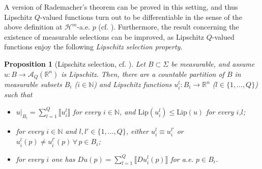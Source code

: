 \documentclass[a4paper,11pt,reqno]{amsart}
\newtheorem{proposition}[theorem]{Proposition}
\theoremstyle{definition}
\numberwithin{equation}{section}
\numberwithin{subsection}{section}
\newcommand{\N}{\mathbb{N}}
\newcommand{\R}{\mathbb{R}}
\newcommand{\A}{\mathcal{A}}
\newcommand{\Lip}{\mathrm{Lip}}
\newcommand{\spt}{\mathrm{spt}}
\newcommand{\Ha}{\mathcal{H}}
\begin{document}
A version of Rademacher's theorem can be proved in this setting, and thus Lipschitz $Q$-valued functions turn out to be differentiable in the sense of the above definition at $\Ha^{m}$-a.e. $p$ (cf. \cite[Theorem 1.13]{DLS11a}). Furthermore, the result concerning the existence of measurable selections can be improved, as Lipschitz $Q$-valued functions enjoy the following \emph{Lipschitz selection property}.
\begin{proposition}[Lipschitz selection, cf. {\cite[Lemma 1.1]{DLS13a}}] \label{Lip_sel}
Let $B \subset \Sigma$ be measurable, and assume $u \colon B \to \A_{Q}(\R^n)$ is Lipschitz. Then, there are a countable partition of $B$ in measurable subsets $B_{i}$ ($i \in \N$) and Lipschitz functions $u_{i}^{l} \colon B_{i} \to \R^n$ ($l \in \{1,\dots,Q\}$) such that
\begin{itemize}
\item[$(a)$] $u|_{B_i} = \sum_{l=1}^{Q} \llbracket u_{i}^{l} \rrbracket$ for every $i \in \N$, and $\Lip(u_{i}^{l}) \leq \Lip(u)$ for every $i$,$l$;
\item[$(b)$] for every $i \in \N$ and $l, l' \in \{1,\dots,Q\}$, either $u_{i}^{l} \equiv u_{i}^{l'}$ or $u_{i}^{l}(p) \neq u_{i}^{l'}(p) \, \forall \, p \in B_{i}$;
\item[$(c)$] for every $i$ one has $Du(p) = \sum_{l=1}^{Q} \llbracket Du_{i}^{l}(p) \rrbracket$ for a.e. $p \in B_{i}$.
\end{itemize}
\end{proposition}

\end{document}

